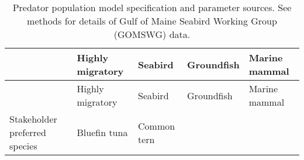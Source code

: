 \documentclass[]{article}
\begin{document}
\begin{longtable}[]{@{}lllll@{}}
\caption{Predator population model specification and parameter sources.
See methods for details of Gulf of Maine Seabird Working Group (GOMSWG)
data. \label{predsource}}\tabularnewline
\toprule
\begin{minipage}[b]{0.17\columnwidth}\raggedright\strut
\strut
\end{minipage} & \begin{minipage}[b]{0.17\columnwidth}\raggedright\strut
Highly migratory\strut
\end{minipage} & \begin{minipage}[b]{0.17\columnwidth}\raggedright\strut
Seabird\strut
\end{minipage} & \begin{minipage}[b]{0.17\columnwidth}\raggedright\strut
Groundfish\strut
\end{minipage} & \begin{minipage}[b]{0.17\columnwidth}\raggedright\strut
Marine mammal\strut
\end{minipage}\tabularnewline
\midrule
\endfirsthead
\toprule
\begin{minipage}[b]{0.17\columnwidth}\raggedright\strut
\strut
\end{minipage} & \begin{minipage}[b]{0.17\columnwidth}\raggedright\strut
Highly migratory\strut
\end{minipage} & \begin{minipage}[b]{0.17\columnwidth}\raggedright\strut
Seabird\strut
\end{minipage} & \begin{minipage}[b]{0.17\columnwidth}\raggedright\strut
Groundfish\strut
\end{minipage} & \begin{minipage}[b]{0.17\columnwidth}\raggedright\strut
Marine mammal\strut
\end{minipage}\tabularnewline
\midrule
\endhead
\begin{minipage}[t]{0.17\columnwidth}\raggedright\strut
Stakeholder preferred species\strut
\end{minipage} & \begin{minipage}[t]{0.17\columnwidth}\raggedright\strut
Bluefin tuna\strut
\end{minipage} & \begin{minipage}[t]{0.17\columnwidth}\raggedright\strut
Common tern\strut
\end{minipage} & \begin{minipage}[t]{0.17\columnwidth}\raggedright\strut

\end{minipage}
\end{longtable}
\end{document}
